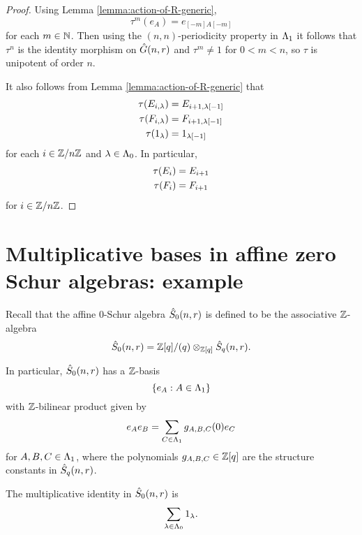 \documentclass[a4paper, 11pt, twoside]{report}
\begin{document}
\begin{proof}
Using Lemma \ref{lemma:action-of-R-generic},
\begin{equation*}
\tau^m{(e_A)} = e_{[-m]A[-m]}
\end{equation*}
for each $m\in\mathbb{N}$. Then using the $(n,n)$-periodicity property in $\Lambda_1{}$ it follows that $\tau^n$ is the identity morphism on $\hat{G}(n,r)$ and $\tau^m\neq 1$ for $0<m<n$, so $\tau$ is unipotent of order $n$.

It also follows from Lemma \ref{lemma:action-of-R-generic} that
\begin{align*}
\tau{(E_{i,\lambda})} &= E_{i+1,\lambda[-1]}\\
\tau{(F_{i,\lambda})} &= F_{i+1,\lambda[-1]}\\
\tau{(1_\lambda)} &= 1_{\lambda[-1]}
\end{align*}
for each $i\in\mathbb{Z}/{n \mathbb{Z}}$ and $\lambda\in\Lambda_0{}$. In particular,
\begin{align*}
\tau{(E_i)} &= E_{i+1}\\
\tau{(F_i)} &= F_{i+1}
\end{align*}
for $i\in\mathbb{Z}/{n \mathbb{Z}}$.
\end{proof}


\section{Multiplicative bases in affine zero Schur algebras: example}

Recall that the affine $0$-Schur algebra $\hat{S}_0(n,r)$ is defined to be the associative $\mathbb{Z}$-algebra
\begin{equation*}
\hat{S}_0(n,r) = {\mathbb{Z}[q]}/{(q)}\otimes_{\mathbb{Z}[q]} \hat{S}_q(n,r).
\end{equation*}

In particular, $\hat{S}_0(n,r)$ has a $\mathbb{Z}$-basis
\begin{equation*}
\{e_A:A\in\Lambda_1{}\}
\end{equation*}
with $\mathbb{Z}$-bilinear product given by
\begin{equation*}
e_A e_B = \sum_{C\in\Lambda_1{}} g_{A,B,C}(0) e_C
\end{equation*}
for $A,B,C\in\Lambda_1{}$, where the polynomials $g_{A,B,C}\in\mathbb{Z}[q]$ are the structure constants in $\hat{S}_q(n,r)$.

The multiplicative identity in $\hat{S}_0(n,r)$ is
\begin{equation*}
\sum_{\lambda\in\Lambda_0{}} 1_\lambda.
\end{equation*}
\end{document}

